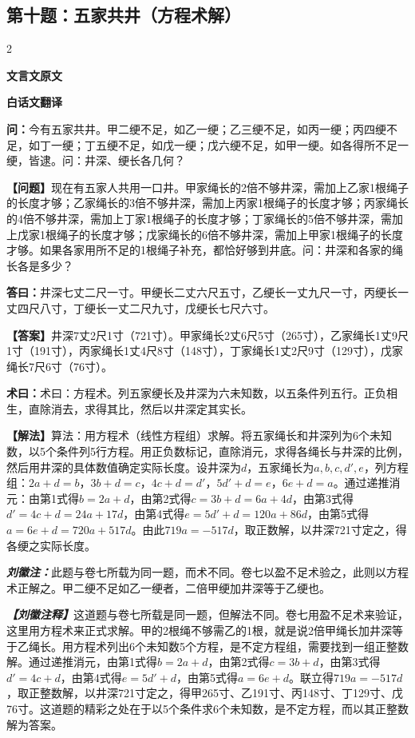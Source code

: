 \documentclass[10pt,a4paper]{article}
\newcommand{\wen}[1]{\textbf{\color{problemcolor}问：}#1\par}
\newcommand{\da}[1]{\textbf{答曰：}#1\par}
\newcommand{\shu}[1]{\textbf{术曰：}#1\par}
\newcommand{\liuhui}[1]{{\color{commentarycolor}\textit{\textbf{刘徽注：}}#1\par}}
\newcommand{\classicalheader}[1]{{\centering\large\bfseries\color{classicalcolor} #1\par\vspace{0.5em}}}
\newcommand{\wenmodern}[1]{\textbf{\color{moderncolor}【问题】}#1\par}
\newcommand{\damodern}[1]{\textbf{【答案】}#1\par}
\newcommand{\shumodern}[1]{\textbf{【解法】}#1\par}
\newcommand{\liuhuimodern}[1]{{\color{commentarycolor}\textit{\textbf{【刘徽注释】}}#1\par}}
\newcommand{\modernheader}[1]{{\centering\large\bfseries\color{moderncolor} #1\par\vspace{0.5em}}}
\newcommand{\problemsec}[1]{\subsection*{#1}}
\begin{document}
\problemsec{第十题：五家共井（方程术解）}
\begin{paracol}{2}
\classicalheader{文言文原文}
\switchcolumn
\modernheader{白话文翻译}
\switchcolumn*

\wen{今有五家共井。甲二绠不足，如乙一绠；乙三绠不足，如丙一绠；丙四绠不足，如丁一绠；丁五绠不足，如戊一绠；戊六绠不足，如甲一绠。如各得所不足一绠，皆逮。问：井深、绠长各几何？}

\switchcolumn

\wenmodern{现在有五家人共用一口井。甲家绳长的2倍不够井深，需加上乙家1根绳子的长度才够；乙家绳长的3倍不够井深，需加上丙家1根绳子的长度才够；丙家绳长的4倍不够井深，需加上丁家1根绳子的长度才够；丁家绳长的5倍不够井深，需加上戊家1根绳子的长度才够；戊家绳长的6倍不够井深，需加上甲家1根绳子的长度才够。如果各家用所不足的1根绳子补充，都恰好够到井底。问：井深和各家的绳长各是多少？}

\switchcolumn*

\da{井深七丈二尺一寸。甲绠长二丈六尺五寸，乙绠长一丈九尺一寸，丙绠长一丈四尺八寸，丁绠长一丈二尺九寸，戊绠长七尺六寸。}

\switchcolumn

\damodern{井深7丈2尺1寸（721寸）。甲家绳长2丈6尺5寸（265寸），乙家绳长1丈9尺1寸（191寸），丙家绳长1丈4尺8寸（148寸），丁家绳长1丈2尺9寸（129寸），戊家绳长7尺6寸（76寸）。}

\switchcolumn*

\shu{术曰：方程术。列五家绠长及井深为六未知数，以五条件列五行。正负相生，直除消去，求得其比，然后以井深定其实长。}

\switchcolumn

\shumodern{算法：用方程术（线性方程组）求解。将五家绳长和井深列为6个未知数，以5个条件列5行方程。用正负数标记，直除消元，求得各绳长与井深的比例，然后用井深的具体数值确定实际长度。设井深为$d$，五家绳长为$a,b,c,d',e$，列方程组：$2a+d=b$，$3b+d=c$，$4c+d=d'$，$5d'+d=e$，$6e+d=a$。通过递推消元：由第1式得$b=2a+d$，由第2式得$c=3b+d=6a+4d$，由第3式得$d'=4c+d=24a+17d$，由第4式得$e=5d'+d=120a+86d$，由第5式得$a=6e+d=720a+517d$。由此$719a=-517d$，取正数解，以井深721寸定之，得各绠之实际长度。}

\switchcolumn*

\liuhui{此题与卷七所载为同一题，而术不同。卷七以盈不足术验之，此则以方程术正解之。甲二绠不足如乙一绠者，二倍甲绠加井深等于乙绠也。}

\switchcolumn

\liuhuimodern{这道题与卷七所载是同一题，但解法不同。卷七用盈不足术来验证，这里用方程术来正式求解。甲的2根绳不够需乙的1根，就是说2倍甲绳长加井深等于乙绳长。用方程术列出6个未知数5个方程，是不定方程组，需要找到一组正整数解。通过递推消元，由第1式得$b=2a+d$，由第2式得$c=3b+d$，由第3式得$d'=4c+d$，由第4式得$e=5d'+d$，由第5式得$a=6e+d$。联立得$719a=-517d$，取正整数解，以井深721寸定之，得甲265寸、乙191寸、丙148寸、丁129寸、戊76寸。这道题的精彩之处在于以5个条件求6个未知数，是不定方程，而以其正整数解为答案。}

\end{paracol}
\end{document}
